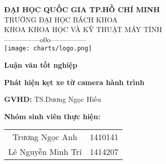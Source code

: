 \documentclass[12pt]{report}
\begin{document}
\begin{titlepage}

\begin{center}
	\textbf{ĐẠI HỌC QUỐC GIA TP.HỒ CHÍ MINH}\\
	TRƯỜNG ĐẠI HỌC BÁCH KHOA\\
	KHOA KHOA HỌC VÀ KỸ THUẬT MÁY TÍNH\\
	---------------o0o--------------- \\
	\vspace{5mm}
	\texttt{[image: charts/logo.png]}
\end{center}
\vspace{5mm}

\begin{center}
	\textbf{Luận văn tốt nghiệp}
\end{center}

\textbf{\Large Phát hiện kẹt xe từ camera hành trình}

\vspace{5mm}

\textbf{GVHD: } TS.Dương Ngọc Hiếu

\vspace{5mm}

\textbf{Nhóm sinh viên thực hiện:}\par
\begin{tabular}{ c c }
 Trương Ngọc Anh & 1410141 \\ 
 Lê Nguyễn Minh Trí & 1414207     
\end{tabular}

\thispagestyle{empty}
\end{titlepage}
%
\tableofcontents

%

%
\listoffigures
\listoftables
%
\newpage\cleardoublepage
\newpage\cleardoublepage
\newpage\cleardoublepage
\newpage\cleardoublepage
\newpage\cleardoublepage
\newpage\cleardoublepage
\newpage\cleardoublepage
%
\nocite{*}
\newpage\cleardoublepage

\end{document}
